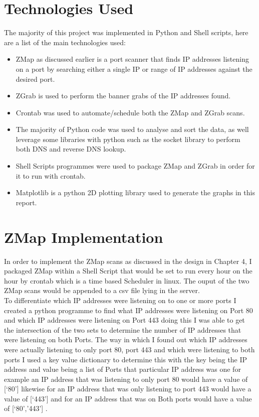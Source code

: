 \documentclass[a4wide,leqno,12pt]{report}
\begin{document}
\section{Technologies Used}
The majority of this project was implemented in Python and Shell scripts, here are a list of the main technologies used:
\begin{itemize}
  \item ZMap as discussed earlier is a port scanner that finds IP addresses listening on a port by searching either a single IP or range of IP addresses against the desired port.
  \item ZGrab is used to perform the banner grabs of the IP addresses found.
  \item Crontab \cite{keller1999take} was used to automate/schedule both the ZMap and ZGrab scans.
  \item The majority of Python code was used to analyse and sort the data, as well leverage some libraries with python such as the socket library \cite{socket} to perform both DNS and reverse DNS lookup.
  \item Shell Scripts programmes were used to package ZMap and ZGrab in order for it to run with crontab.
  \item Matplotlib \cite{matplotlib} is a python 2D plotting library used to generate the graphs in this report.
\end{itemize}

\section{ZMap Implementation}
In order to implement the ZMap scans as discussed in the design in Chapter 4, I packaged ZMap within a Shell Script that would be set to run every hour on the hour by crontab which is a time based Scheduler in linux. The ouput of the two ZMap scans would be appended to a csv file lying in the server.\\

To differentiate which IP addresses were listening on to one or more ports I created a python programme to find what IP addresses were listening on Port 80 and which IP addresses were listening on Port 443 doing this I was able to get the intersection of the two sets to determine the number of IP addresses that were listening on both Ports. The way in which I found out which IP addresses were actually listening to only port 80, port 443 and which were listening to both ports I used a key value dictionary to determine this with the key being the IP address and value being a list of Ports that particular IP address was one for example an IP address that was listening to only port 80 would have a value of [‘80’] likewise for an IP address that was only listening to port 443 would have a value of [‘443’] and for an IP address that was on Both ports would have a value of [‘80’,’443’] .
\end{document}
